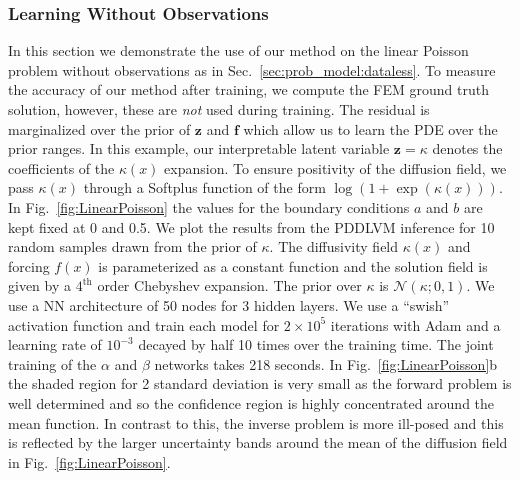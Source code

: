 \documentclass[11pt, fleqn]{article}
\def\z{{\mathbf z}}
\def\fbf{{\mathbf f}}
\def\NPDF{{\mathcal N}}
\begin{document}
\subsubsection{Learning Without Observations}\label{sec:joint_learning_without_obs}
%
In this section we demonstrate the use of our method on the linear Poisson problem without observations as in Sec.~\ref{sec:prob_model:dataless}. To measure the accuracy of our method after training, we compute the \gls*{FEM} ground truth solution, however, these are \textit{not} used during training. The residual is marginalized over the prior of $\z$ and $\fbf$ which allow us to learn the PDE over the prior ranges. In this example, our interpretable latent variable $\z = \kappa$ denotes the coefficients of the $\kappa(x)$ expansion. To ensure positivity of the diffusion field, we pass $\kappa(x)$ through a Softplus function of the form $\log(1+\exp(\kappa(x)))$. In Fig.~\ref{fig:LinearPoisson} the values for the boundary conditions $a$ and $b$ are kept fixed at 0 and 0.5. We plot the results from the \gls*{PDDLVM} inference for 10 random samples drawn from the prior of ${\kappa}$. The diffusivity field $\kappa(x)$ and forcing $f(x)$ is parameterized as a constant function and the solution field is given by a $4^\text{th}$ order Chebyshev expansion. The prior over $\kappa$ is $\NPDF(\kappa; 0, 1)$. We use a NN architecture of 50 nodes for 3 hidden layers. We use a ``swish'' activation function and train each model for $2\times 10^5$ iterations with Adam and a learning rate of $10^{-3}$ decayed by half 10 times over the training time. The joint training of the $\alpha$ and $\beta$ networks takes 218 seconds.
In Fig.~\ref{fig:LinearPoisson}b the shaded region for 2 standard deviation is very small as the forward problem is well determined and so the confidence region is highly concentrated around the mean function. In contrast to this, the inverse problem is more ill-posed and this is reflected by the larger uncertainty bands around the mean of the diffusion field in Fig.~\ref{fig:LinearPoisson}.
\end{document}

